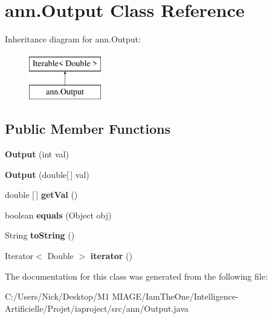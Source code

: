 \hypertarget{classann_1_1_output}{}\section{ann.\+Output Class Reference}
\label{classann_1_1_output}
Inheritance diagram for ann.\+Output\+:\begin{figure}[H]
\begin{center}
\leavevmode
\includegraphics[height=2.000000cm]{classann_1_1_output}
\end{center}
\end{figure}
\subsection*{Public Member Functions}
\begin{DoxyCompactItemize}
\item 
\mbox{\label{classann_1_1_output_a7ab3d7c14034fdbe2d6482935f44c9a0}} 
{\bfseries Output} (int val)
\item 
\mbox{\label{classann_1_1_output_a82f2133f54dcc48c400f894a62eec8f0}} 
{\bfseries Output} (double\mbox{[}$\,$\mbox{]} val)
\item 
\mbox{\label{classann_1_1_output_a29ceaac61553a61df12b616d3d62ee84}} 
double \mbox{[}$\,$\mbox{]} {\bfseries get\+Val} ()
\item 
\mbox{\label{classann_1_1_output_aa144e935bfe1b126ba527151b1653b69}} 
boolean {\bfseries equals} (Object obj)
\item 
\mbox{\label{classann_1_1_output_a7617bd1ab1914c05d797e8bf93b9dcd7}} 
String {\bfseries to\+String} ()
\item 
\mbox{\label{classann_1_1_output_abf286f373059401bfa29bafbe134ebbc}} 
Iterator$<$ Double $>$ {\bfseries iterator} ()
\end{DoxyCompactItemize}


The documentation for this class was generated from the following file\+:\begin{DoxyCompactItemize}
\item 
C\+:/\+Users/\+Nick/\+Desktop/\+M1 M\+I\+A\+G\+E/\+Iam\+The\+One/\+Intelligence-\/\+Artificielle/\+Projet/iaproject/src/ann/Output.\+java\end{DoxyCompactItemize}
